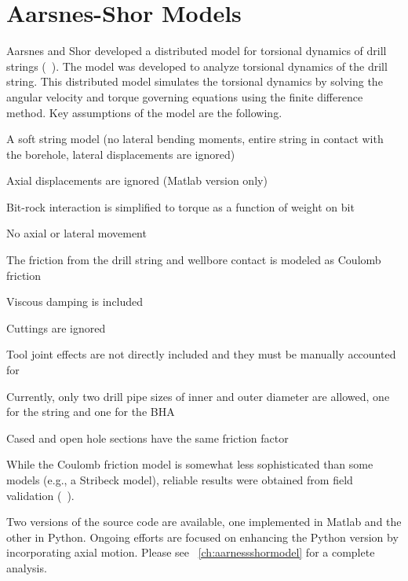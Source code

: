 \section{Aarsnes-Shor Models}
Aarsnes and Shor developed a distributed model for torsional dynamics of drill strings (~\cite{ref:aarsnes2017a}).  The model was developed to analyze torsional dynamics of the drill string.  This distributed model simulates the torsional dynamics by solving the angular velocity and torque governing equations using the finite difference method. Key assumptions of the model are the following.
\begin{bulletedlist}
	\item A soft string model (no lateral bending moments, entire string in contact with the borehole, lateral displacements are ignored)
	\item Axial displacements are ignored (Matlab version only)
	\item Bit-rock interaction is simplified to torque as a function of weight on bit
	\item No axial or lateral movement
	\item The friction from the drill string and wellbore contact is modeled as Coulomb friction
    \item Viscous damping is included
    \item Cuttings are ignored
    \item Tool joint effects are not directly included and they must be manually accounted for
    \item Currently, only two drill pipe sizes of inner and outer diameter are allowed, one for the string and one for the BHA
    \item Cased and open hole sections have the same friction factor
\end{bulletedlist}

While the Coulomb friction model is somewhat less sophisticated than some models (e.g., a Stribeck model), reliable results were obtained from field validation (~\cite{ref:aarsnes2017a}).

Two versions of the source code are available, one implemented in Matlab and the other in Python.  Ongoing efforts are focused on enhancing the Python version by incorporating axial motion. Please see \chaptername~\ref{ch:aarnessshormodel} for a complete analysis.


